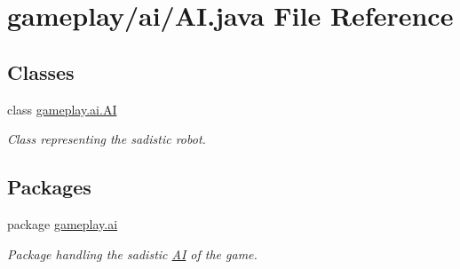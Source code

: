 \hypertarget{a00043}{\section{gameplay/ai/\-A\-I.java File Reference}
\label{a00043}
}
\subsection*{Classes}
\begin{DoxyCompactItemize}
\item 
class \hyperlink{a00001}{gameplay.\-ai.\-A\-I}
\begin{DoxyCompactList}\small\item\em Class representing the sadistic robot. \end{DoxyCompactList}\end{DoxyCompactItemize}
\subsection*{Packages}
\begin{DoxyCompactItemize}
\item 
package \hyperlink{a00082}{gameplay.\-ai}
\begin{DoxyCompactList}\small\item\em Package handling the sadistic \hyperlink{a00001}{A\-I} of the game. \end{DoxyCompactList}\end{DoxyCompactItemize}
